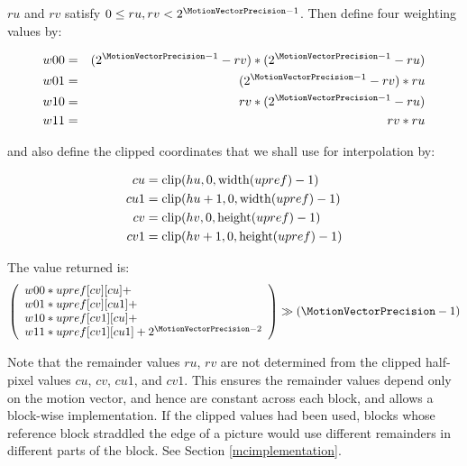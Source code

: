 $ru$ and $rv$ satisfy $0\leq ru,rv <2^{\MotionVectorPrecision-1}$. Then define four weighting
values by:

\begin{eqnarray*}
w00 & = & (2^{\MotionVectorPrecision-1}-rv)*(2^{\MotionVectorPrecision-1}-ru)\\
w01 & = & (2^{\MotionVectorPrecision-1}-rv)*ru\\
w10 & = & rv*(2^{\MotionVectorPrecision-1}-ru)\\
w11 & = & rv*ru
\end{eqnarray*}

and also define the clipped coordinates that we shall use for interpolation by:

\begin{eqnarray*}
cu & = \operatorname{clip}(hu, 0, \operatorname{width}(upref)-1) \\
cu1 & = \operatorname{clip}(hu+1, 0, \operatorname{width}(upref)-1) \\
cv & = \operatorname{clip}(hv, 0, \operatorname{height}(upref)-1) \\
cv1 & = \operatorname{clip}(hv+1, 0, \operatorname{height}(upref)-1)
\end{eqnarray*}

The value returned is:
\[
\left(
\begin{array}{l}
w00*upref[cv][cu]+\\
w01*upref[cv][cu1]+\\
w10*upref[cv1][cu]+\\
w11*upref[cv1][cu1]+2^{\MotionVectorPrecision-2}
\end{array}
\right)\gg(\MotionVectorPrecision-1)\]

\begin{informative}
Note that the remainder values $ru$, $rv$ are not determined from the clipped
half-pixel values $cu$, $cv$, $cu1$, and $cv1$. This ensures the remainder
values depend only on the motion vector, and hence are constant across
each block, and allows a block-wise implementation. If the clipped values 
had been used, blocks whose reference
block straddled the edge of a picture would use different remainders in
different parts of the block. See Section \ref{mcimplementation}.
\end{informative}

